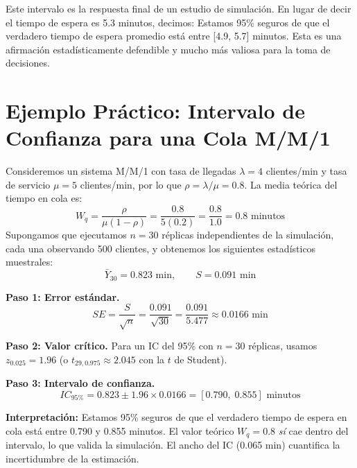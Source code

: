 \documentclass[11pt, letterpaper]{article}
\begin{document}
Este intervalo es la respuesta final de un estudio de simulación. En lugar de decir el tiempo de espera es 5.3 minutos, decimos: Estamos 95\% seguros de que el verdadero tiempo de espera promedio está entre [4.9, 5.7] minutos. Esta es una afirmación estadísticamente defendible y mucho más valiosa para la toma de decisiones.

\newpage
\section{Ejemplo Práctico: Intervalo de Confianza para una Cola M/M/1}

Consideremos un sistema M/M/1 con tasa de llegadas $\lambda = 4$ clientes/min y tasa de servicio $\mu = 5$ clientes/min, por lo que $\rho = \lambda/\mu = 0.8$. La media teórica del tiempo en cola es:
\[
W_q = \frac{\rho}{\mu(1-\rho)} = \frac{0.8}{5(0.2)} = \frac{0.8}{1.0} = 0.8 \text{ minutos}
\]
Supongamos que ejecutamos $n = 30$ réplicas independientes de la simulación, cada una observando 500 clientes, y obtenemos los siguientes estadísticos muestrales:
\[ \bar{Y}_{30} = 0.823 \text{ min}, \qquad S = 0.091 \text{ min} \]

\textbf{Paso 1: Error estándar.}
\[ SE = \frac{S}{\sqrt{n}} = \frac{0.091}{\sqrt{30}} = \frac{0.091}{5.477} \approx 0.0166 \text{ min} \]

\textbf{Paso 2: Valor crítico.} Para un IC del 95\% con $n = 30$ réplicas, usamos $z_{0.025} = 1.96$ (o $t_{29,0.975} \approx 2.045$ con la $t$ de Student).

\textbf{Paso 3: Intervalo de confianza.}
\[ IC_{95\%} = 0.823 \pm 1.96 \times 0.0166 = [0.790,\; 0.855] \text{ minutos} \]

\textbf{Interpretación:} Estamos 95\% seguros de que el verdadero tiempo de espera en cola está entre 0.790 y 0.855 minutos. El valor teórico $W_q = 0.8$ \emph{sí} cae dentro del intervalo, lo que valida la simulación. El ancho del IC (0.065 min) cuantifica la incertidumbre de la estimación.




\end{document}
